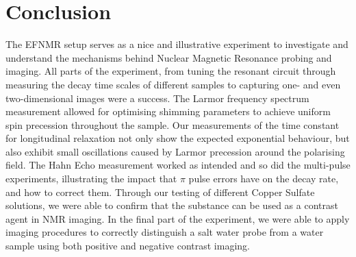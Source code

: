 \documentclass[
    parskip=half, 
    twoside=false,
    twocolumn=true,
    fontsize=11pt,
]{scrarticle}
\begin{document}
\section{Conclusion}
The EFNMR setup serves as a nice and illustrative experiment to investigate and understand the mechanisms behind Nuclear Magnetic Resonance probing and imaging. All parts of the experiment, from tuning the resonant circuit through measuring the decay time scales of different samples to capturing one- and even two-dimensional images were a success. The Larmor frequency spectrum measurement allowed for optimising shimming parameters to achieve uniform spin precession throughout the sample. Our measurements of the time constant for longitudinal relaxation not only show the expected exponential behaviour, but also exhibit small oscillations caused by Larmor precession around the polarising field. The Hahn Echo measurement worked as intended and so did the multi-pulse experiments, illustrating the impact that $\pi$ pulse errors have on the decay rate, and how to correct them. Through our testing of different Copper Sulfate solutions, we were able to confirm that the substance can be used as a contrast agent in NMR imaging. In the final part of the experiment, we were able to apply imaging procedures to correctly distinguish a salt water probe from a water sample using both positive and negative contrast imaging.

\nocite{*}
\printbibliography
\end{document}
